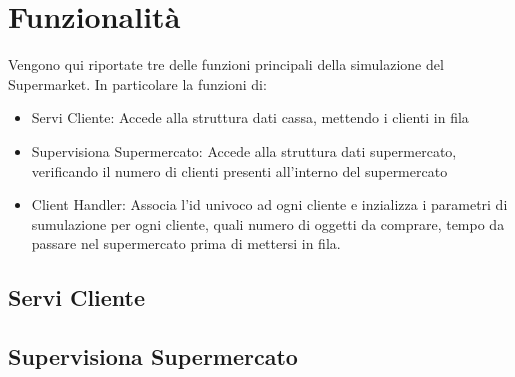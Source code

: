 \documentclass[a4paper, 12pt]{article}
\begin{document}
\section{Funzionalità}
Vengono qui riportate tre delle funzioni principali della simulazione del Supermarket. In particolare la funzioni di:
\begin{itemize}[noitemsep,topsep=0pt,parsep=0pt,partopsep=0pt]
    \item Servi Cliente: Accede alla struttura dati cassa, mettendo i clienti in fila
    \item Supervisiona Supermercato: Accede alla struttura dati supermercato, verificando il numero di clienti presenti all'interno del supermercato
    \item Client Handler: Associa l'id univoco ad ogni cliente e inzializza i parametri di sumulazione per ogni cliente, quali numero di oggetti da comprare, tempo da passare nel supermercato prima di mettersi in fila.
\end{itemize}
\subsection{Servi Cliente}

\subsection{Supervisiona Supermercato}

\end{document}
